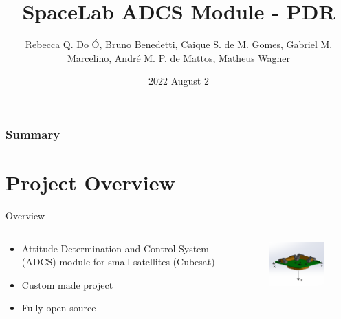 \documentclass{beamer}
\title[Presentation]{SpaceLab ADCS Module - PDR}
\author[SpaceLab]{Rebecca Q. Do Ó, Bruno Benedetti, Caique S. de M. Gomes, Gabriel M. Marcelino, André M. P. de Mattos, Matheus Wagner}
\institute[]{SpaceLab - UFSC}
\date{2022 August 2}
\begin{document}
    
    
    
    \begin{frame}
        \titlepage
    \end{frame}

    \begin{frame}
        \frametitle{Summary}
        \tableofcontents
    \end{frame}
    
    \section{Project Overview}

        
        
    \begin{frame}{Overview}

    \begin{columns}[t]
        \begin{column}[t]{0.5\textwidth}
            \begin{itemize}
                \item Attitude Determination and Control System (ADCS) module for small satellites (Cubesat)
                \vspace{0.3cm}
                \item Custom made project
                \vspace{0.3cm}
                \item Fully open source

            \end{itemize}
        \end{column}
        \begin{column}[t]{0.5\textwidth}
            \begin{figure}[!ht]
                \begin{center}
                    \includegraphics[width=5.5cm]{figures/Image axles.png}
                \end{center}
            \end{figure}
        \end{column}
    \end{columns}

\end{frame}
\end{document}
